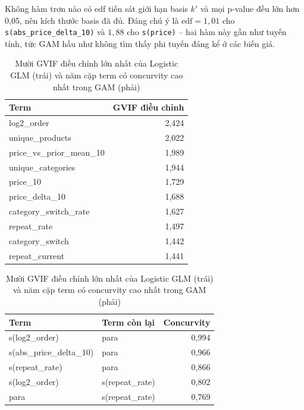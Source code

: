 Không hàm trơn nào có edf tiến sát giới hạn basis $k'$ và mọi p-value đều lớn hơn
0,05, nên kích thước basis đã đủ. Đáng chú ý là
$\text{edf} = 1{,}01$ cho \texttt{s(abs\_price\_delta\_10)} và $1{,}88$ cho
\texttt{s(price)} -- hai hàm này gần như tuyến tính, tức GAM hầu như không tìm
thấy phi tuyến đáng kể ở các biến giá.

\begin{table}[H]
\centering
\caption{Mười GVIF điều chỉnh lớn nhất của Logistic GLM (trái) và năm cặp term
có concurvity cao nhất trong GAM (phải)}
\label{tab:collinearity}
\small
\begin{minipage}[t]{0.46\textwidth}
\centering
\begin{tabular}{lr}
\toprule
\textbf{Term} & \textbf{GVIF điều chỉnh} \\
\midrule
log2\_order             & 2,424 \\
unique\_products        & 2,022 \\
price\_vs\_prior\_mean\_10 & 1,989 \\
unique\_categories      & 1,944 \\
price\_10               & 1,729 \\
price\_delta\_10        & 1,688 \\
category\_switch\_rate  & 1,627 \\
repeat\_rate            & 1,497 \\
category\_switch        & 1,442 \\
repeat\_current         & 1,441 \\
\bottomrule
\end{tabular}
\end{minipage}
\hfill
\begin{minipage}[t]{0.50\textwidth}
\centering
\begin{tabular}{llr}
\toprule
\textbf{Term} & \textbf{Term còn lại} & \textbf{Concurvity} \\
\midrule
s(log2\_order)          & para           & 0,994 \\
s(abs\_price\_delta\_10) & para           & 0,966 \\
s(repeat\_rate)         & para           & 0,866 \\
s(log2\_order)          & s(repeat\_rate) & 0,802 \\
para                    & s(repeat\_rate) & 0,769 \\
\bottomrule
\end{tabular}
\end{minipage}
\end{table}

